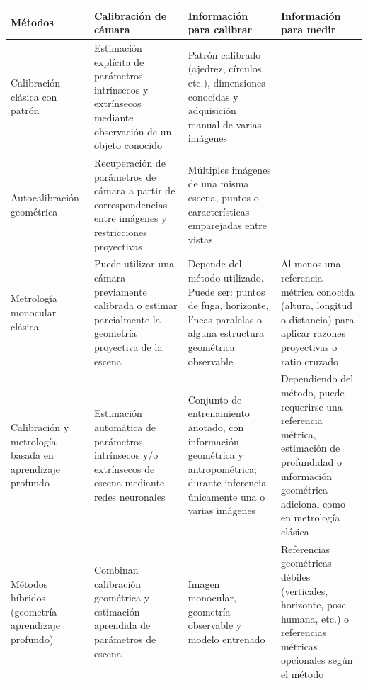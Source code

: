 \begin{table}[H]
\centering
\scriptsize
\renewcommand{\arraystretch}{1.3}
\begin{tabular}{p{2.8cm} p{2.8cm} p{2.8cm} p{2.8cm}}
\hline
\textbf{Métodos} &
\textbf{Calibración de cámara} &
\textbf{Información para calibrar} &
\textbf{Información para medir} \\
\hline

Calibración clásica con patrón~\cite{ManualCameraCalib, CalibrationSurvey} &
Estimación explícita de parámetros intrínsecos y extrínsecos mediante observación de un objeto conocido &
Patrón calibrado (ajedrez, círculos, etc.), dimensiones conocidas y adquisición manual de varias imágenes &
\\

\hline

Autocalibración geométrica~\cite{CameraSelfCalibration, CalibrationSurvey}&
Recuperación de parámetros de cámara a partir de correspondencias entre imágenes y restricciones proyectivas &
Múltiples imágenes de una misma escena, puntos o características emparejadas entre vistas &
\\

\hline

Metrología monocular clásica~\cite{CriminisiApplications}
&
Puede utilizar una cámara previamente calibrada o estimar parcialmente la geometría proyectiva de la escena &
Depende del método utilizado. Puede ser: puntos de fuga, horizonte, líneas paralelas o alguna estructura geométrica observable &
Al menos una referencia métrica conocida (altura, longitud o distancia) para aplicar razones proyectivas o ratio cruzado \\

\hline

Calibración y metrología basada en aprendizaje profundo~\cite{SVMIW, DepthMapMultiScale} &
Estimación automática de parámetros intrínsecos y/o extrínsecos de escena mediante redes neuronales &
Conjunto de entrenamiento anotado, con información geométrica y antropométrica; durante inferencia únicamente una o varias imágenes &
Dependiendo del método, puede requerirse una referencia métrica, estimación de profundidad o información geométrica adicional como en metrología clásica \\

\hline

Métodos híbridos
(geometría + aprendizaje profundo)~\cite{Make3D, GeoCalib} &
Combinan calibración geométrica y estimación aprendida de parámetros de escena &
Imagen monocular, geometría observable y modelo entrenado &
Referencias geométricas débiles (verticales, horizonte, pose humana, etc.) o referencias métricas opcionales según el método \\


\end{tabular}
\end{table}
